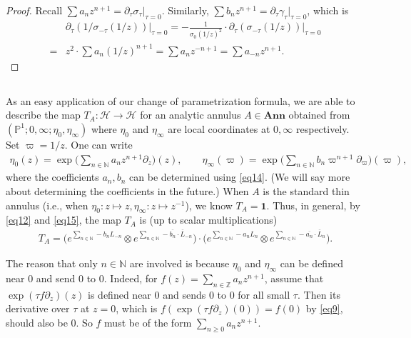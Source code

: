 \documentclass[11pt,b5paper,notitlepage]{article}
\theoremstyle{definition}
\theoremstyle{plain}
\newcommand{\mc}{\mathcal}
\newcommand{\ovl}{\overline}
\newcommand{\id}{\mathbf{1}}
\newcommand{\Nbb}{\mathbb N}
\newcommand{\Zbb}{\mathbb Z}
\newcommand{\Pbb}{\mathbb P}
\newcommand{\Ann}{\mathbf{Ann}}
\numberwithin{equation}{section}
\begin{document}
\begin{proof}
Recall $\sum a_nz^{n+1}=\partial_\tau\sigma_\tau|_{\tau=0}$.  Similarly,  $\sum b_nz^{n+1}=\partial_\tau\gamma_\tau|_{\tau=0}$, which is
\begin{align*}
&\partial_\tau(1/\sigma_{-\tau}(1/z))\big|_{\tau=0}=-\frac 1{\sigma_0(1/z)^2}\cdot \partial_\tau(\sigma_{-\tau}(1/z))\big|_{\tau=0}	\\
=&z^2\cdot \sum a_n(1/z)^{n+1}=\sum a_nz^{-n+1}=\sum a_{-n}z^{n+1}.
\end{align*}
\end{proof}



\subsection{}\label{lb16}

As an easy application of our change of parametrization formula, we are able to describe the map $T_A:\mc H\rightarrow\mc H$ for an analytic annulus $A\in\Ann$ obtained from $(\Pbb^1;0,\infty;\eta_0,\eta_\infty)$ where $\eta_0$ and $\eta_\infty$ are local coordinates at $0,\infty$ respectively. Set $\varpi=1/z$. One can write
\begin{align*}
\eta_0(z)=\exp\Big(\sum_{n\in\Nbb} a_nz^{n+1}\partial_z\Big)(z),\qquad \eta_\infty(\varpi)=\exp\Big(\sum_{n\in\Nbb} b_n \varpi^{n+1}\partial_\varpi\Big)(\varpi),	
\end{align*}
where the coefficients $a_n,b_n$ can be determined using \eqref{eq14}. (We will say more about determining the coefficients in the future.) When $A$ is the standard thin annulus (i.e., when $\eta_0:z\mapsto z,\eta_\infty:z\mapsto z^{-1}$), we know $T_A=\id$. Thus, in general, by \eqref{eq12} and \eqref{eq15}, the map $T_A$ is (up to scalar multiplications)
\begin{align*}
T_A=\Big(e^{\sum_{n\in\Nbb}-b_nL_{-n}}\otimes e^{\sum_{n\in\Nbb}-\ovl{b_n}\cdot \ovl L_{-n}}\Big) \cdot \Big(e^{\sum_{n\in\Nbb} -a_nL_n}\otimes e^{\sum_{n\in\Nbb} -\ovl{a_n}\cdot \ovl L_n}\Big).	
\end{align*}

The reason that only $n\in\Nbb$ are involved is because $\eta_0$ and $\eta_\infty$ can be defined near $0$ and send $0$ to $0$. Indeed, for $f(z)=\sum_{n\in\Zbb} a_n z^{n+1}$, assume that $\exp(\tau f\partial_z)(z)$ is defined near $0$ and sends $0$ to $0$ for all small $\tau$. Then its derivative over $\tau$ at $z=0$, which is $f(\exp(\tau f\partial_z)(0))=f(0)$ by \eqref{eq9}, should also be $0$. So $f$ must be of the form $\sum_{n\geq 0}a_nz^{n+1}$.
\end{document}
